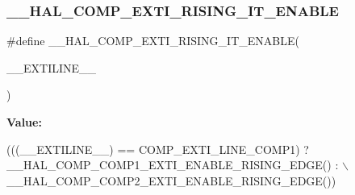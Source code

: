 \subsubsection{\texorpdfstring{\+\_\+\+\_\+\+H\+A\+L\+\_\+\+C\+O\+M\+P\+\_\+\+E\+X\+T\+I\+\_\+\+R\+I\+S\+I\+N\+G\+\_\+\+I\+T\+\_\+\+E\+N\+A\+B\+LE}{\_\_HAL\_COMP\_EXTI\_RISING\_IT\_ENABLE}}
{\footnotesize\ttfamily \#define \+\_\+\+\_\+\+H\+A\+L\+\_\+\+C\+O\+M\+P\+\_\+\+E\+X\+T\+I\+\_\+\+R\+I\+S\+I\+N\+G\+\_\+\+I\+T\+\_\+\+E\+N\+A\+B\+LE(\begin{DoxyParamCaption}\item[{}]{\+\_\+\+\_\+\+E\+X\+T\+I\+L\+I\+N\+E\+\_\+\+\_\+ }\end{DoxyParamCaption})}

{\bfseries Value\+:}
\begin{DoxyCode}
(((\_\_EXTILINE\_\_)  == COMP\_EXTI\_LINE\_COMP1) ? \_\_HAL\_COMP\_COMP1\_EXTI\_ENABLE\_RISING\_EDGE() : \(\backslash\)
                                                          \_\_HAL\_COMP\_COMP2\_EXTI\_ENABLE\_RISING\_EDGE())
\end{DoxyCode}
